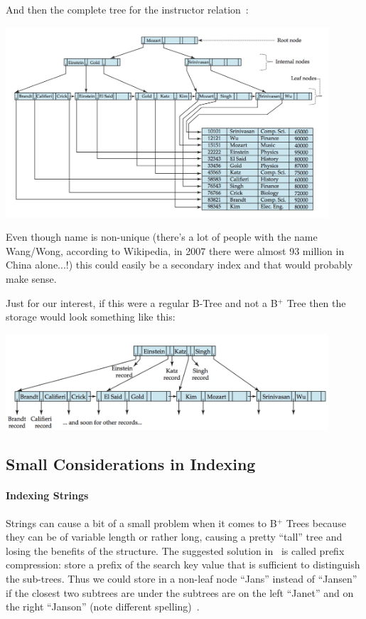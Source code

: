 And then the complete tree for the instructor relation~\cite{dsc}:

\begin{center}
	\includegraphics[width=0.9\textwidth]{images/b-tree-complete}
\end{center}

Even though name is non-unique (there's a lot of people with the name Wang/Wong, according to Wikipedia, in 2007 there were almost 93 million in China alone...!) this could easily be a secondary index and that would probably make sense.

Just for our interest, if this were a regular B-Tree and not a B$^{+}$ Tree then the storage would look something like this:

\begin{center}
	\includegraphics[width=0.9\textwidth]{images/b-tree-equivalent}
\end{center}

\subsection*{Small Considerations in Indexing}

\paragraph{Indexing Strings}
Strings can cause a bit of a small problem when it comes to B$^{+}$ Trees because they can be of variable length or rather long, causing a pretty ``tall'' tree and losing the benefits of the structure. The suggested solution in~\cite{dsc} is called prefix compression: store a prefix of the search key value that is sufficient to distinguish the sub-trees. Thus we could store in a non-leaf node ``Jans'' instead of ``Jansen'' if the closest two subtrees are under the subtrees are on the left ``Janet'' and on the right ``Janson'' (note different spelling)~\cite{dsc}.

